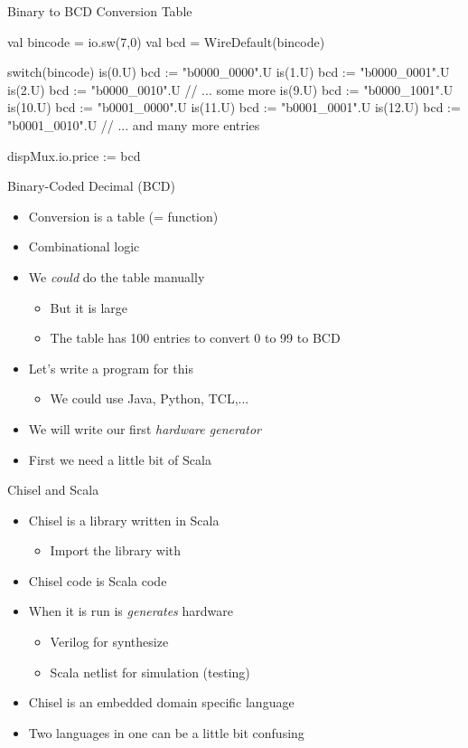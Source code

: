 \begin{frame}[fragile]{Binary to BCD Conversion Table}
\begin{chisel}
  val bincode = io.sw(7,0)
  val bcd = WireDefault(bincode)

  switch(bincode) {
    is(0.U) { bcd := "b0000_0000".U }
    is(1.U) { bcd := "b0000_0001".U }
    is(2.U) { bcd := "b0000_0010".U }
    // ... some more
    is(9.U) { bcd := "b0000_1001".U }
    is(10.U) { bcd := "b0001_0000".U }
    is(11.U) { bcd := "b0001_0001".U }
    is(12.U) { bcd := "b0001_0010".U }
    // ... and many more entries
  }

  dispMux.io.price := bcd
\end{chisel}
\end{frame}

\begin{frame}[fragile]{Binary-Coded Decimal (BCD)}
\begin{itemize}
\item Conversion is a table (= function)
\item Combinational logic
\item We \emph{could} do the table manually
\begin{itemize}
\item But it is large
\item The table has 100 entries to convert 0 to 99 to BCD
\end{itemize}
\item Let's write a program for this
\begin{itemize}
\item We could use Java, Python, TCL,...
\end{itemize}
\item We will write our first \emph{hardware generator}
\item First we need a little bit of Scala
\end{itemize}
\end{frame}



\begin{frame}[fragile]{Chisel and Scala}
\begin{itemize}
\item Chisel is a library written in Scala
\begin{itemize}
\item Import the library with 
\end{itemize}
\item Chisel code is Scala code
\item When it is run is \emph{generates} hardware
\begin{itemize}
\item Verilog for synthesize
\item Scala netlist for simulation (testing)
\end{itemize}
\item Chisel is an embedded domain specific language
\item Two languages in one can be a little bit confusing
\end{itemize}
\end{frame}

